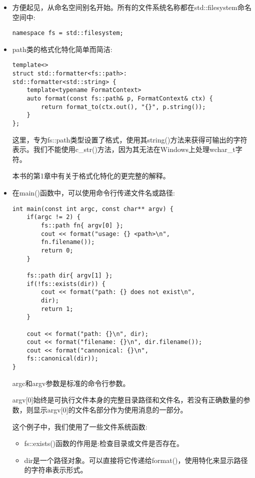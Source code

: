 \begin{itemize}
\item 
方便起见，从命名空间别名开始。所有的文件系统名称都在std::filesystem命名空间中:

\begin{lstlisting}[style=styleCXX]
namespace fs = std::filesystem;
\end{lstlisting}

\item 
path类的格式化特化简单而简洁:

\begin{lstlisting}[style=styleCXX]
template<>
struct std::formatter<fs::path>:
std::formatter<std::string> {
	template<typename FormatContext>
	auto format(const fs::path& p, FormatContext& ctx) {
		return format_to(ctx.out(), "{}", p.string());
	}
};
\end{lstlisting}

这里，专为fs::path类型设置了格式，使用其string()方法来获得可输出的字符表示。我们不能使用c\_str()方法，因为其无法在Windows上处理wchar\_t字符。

本书的第1章中有关于格式化特化的更完整的解释。

\item 
在main()函数中，可以使用命令行传递文件名或路径:

\begin{lstlisting}[style=styleCXX]
int main(const int argc, const char** argv) {
	if(argc != 2) {
		fs::path fn{ argv[0] };
		cout << format("usage: {} <path>\n",
		fn.filename());
		return 0;
	}

	fs::path dir{ argv[1] };
	if(!fs::exists(dir)) {
		cout << format("path: {} does not exist\n",
		dir);
		return 1;
	}

	cout << format("path: {}\n", dir);
	cout << format("filename: {}\n", dir.filename());
	cout << format("cannonical: {}\n",
	fs::canonical(dir));
}
\end{lstlisting}

argc和argv参数是标准的命令行参数。

argv[0]始终是可执行文件本身的完整目录路径和文件名，若没有正确数量的参数，则显示argv[0]的文件名部分作为使用消息的一部分。

这个例子中，我们使用了一些文件系统函数:

\begin{itemize}
\item 
fs::exists()函数的作用是:检查目录或文件是否存在。

\item 
dir是一个路径对象。可以直接将它传递给format()，使用特化来显示路径的字符串表示形式。


\end{itemize}
\end{itemize}
